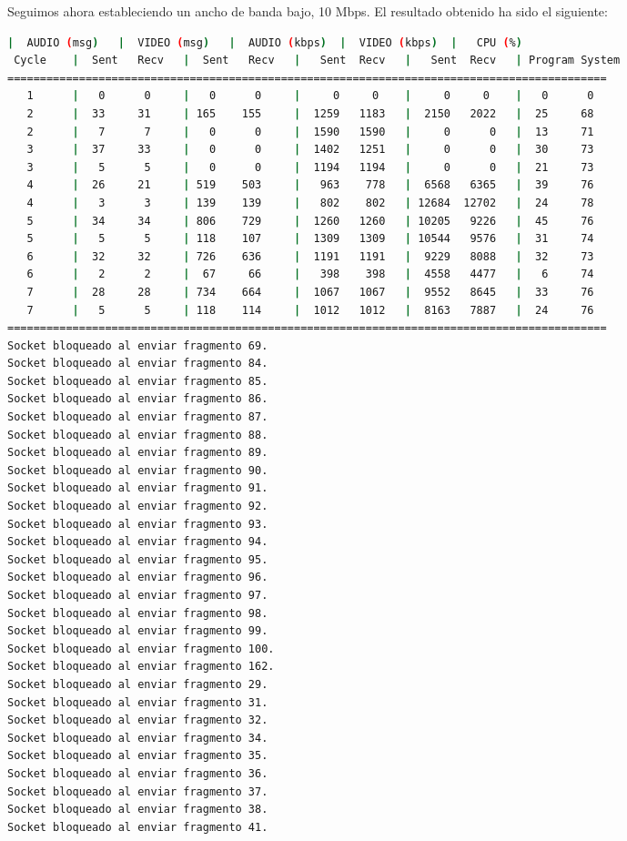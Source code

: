 \vspace{\baselineskip}

\newpage
Seguimos ahora estableciendo un ancho de banda bajo, 10 Mbps. El resultado obtenido ha sido el siguiente:

\vspace{\baselineskip}
\begin{adjustbox}{max width=\textwidth}
\begin{lstlisting}[language=bash,basicstyle=\ttfamily\scriptsize]
          |  AUDIO (msg)   |  VIDEO (msg)   |  AUDIO (kbps)  |  VIDEO (kbps)  |   CPU (%)
 Cycle    |  Sent   Recv   |  Sent   Recv   |   Sent  Recv   |   Sent  Recv   | Program System
============================================================================================
   1      |   0      0     |   0      0     |     0     0    |     0     0    |   0      0
   2      |  33     31     | 165    155     |  1259   1183   |  2150   2022   |  25     68
   2      |   7      7     |   0      0     |  1590   1590   |     0      0   |  13     71
   3      |  37     33     |   0      0     |  1402   1251   |     0      0   |  30     73
   3      |   5      5     |   0      0     |  1194   1194   |     0      0   |  21     73
   4      |  26     21     | 519    503     |   963    778   |  6568   6365   |  39     76
   4      |   3      3     | 139    139     |   802    802   | 12684  12702   |  24     78
   5      |  34     34     | 806    729     |  1260   1260   | 10205   9226   |  45     76
   5      |   5      5     | 118    107     |  1309   1309   | 10544   9576   |  31     74
   6      |  32     32     | 726    636     |  1191   1191   |  9229   8088   |  32     73
   6      |   2      2     |  67     66     |   398    398   |  4558   4477   |   6     74
   7      |  28     28     | 734    664     |  1067   1067   |  9552   8645   |  33     76
   7      |   5      5     | 118    114     |  1012   1012   |  8163   7887   |  24     76
============================================================================================
Socket bloqueado al enviar fragmento 69.
Socket bloqueado al enviar fragmento 84.
Socket bloqueado al enviar fragmento 85.
Socket bloqueado al enviar fragmento 86.
Socket bloqueado al enviar fragmento 87.
Socket bloqueado al enviar fragmento 88.
Socket bloqueado al enviar fragmento 89.
Socket bloqueado al enviar fragmento 90.
Socket bloqueado al enviar fragmento 91.
Socket bloqueado al enviar fragmento 92.
Socket bloqueado al enviar fragmento 93.
Socket bloqueado al enviar fragmento 94.
Socket bloqueado al enviar fragmento 95.
Socket bloqueado al enviar fragmento 96.
Socket bloqueado al enviar fragmento 97.
Socket bloqueado al enviar fragmento 98.
Socket bloqueado al enviar fragmento 99.
Socket bloqueado al enviar fragmento 100.
Socket bloqueado al enviar fragmento 162.
Socket bloqueado al enviar fragmento 29.
Socket bloqueado al enviar fragmento 31.
Socket bloqueado al enviar fragmento 32.
Socket bloqueado al enviar fragmento 34.
Socket bloqueado al enviar fragmento 35.
Socket bloqueado al enviar fragmento 36.
Socket bloqueado al enviar fragmento 37.
Socket bloqueado al enviar fragmento 38.
Socket bloqueado al enviar fragmento 41.


\end{lstlisting}
\end{adjustbox}
